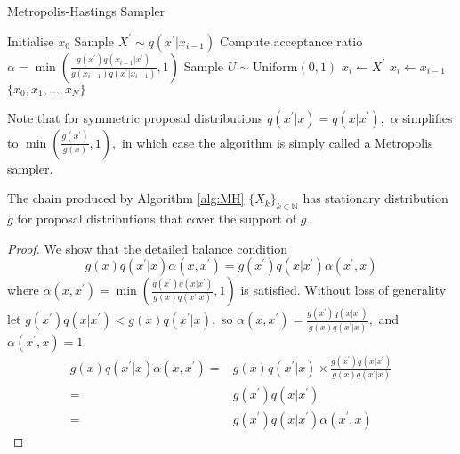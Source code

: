 \begin{algorithm}[htbp]
    \caption{Metropolis-Hastings Sampler}
    \label{alg:MH}
    \begin{algorithmic}
        \State Initialise $x_0$
        \State Sample $X^\prime \sim q(x^\prime|x_{i - 1})$
        \State Compute acceptance ratio
        $\alpha
            = \min\left(
            \frac{
            g(x^\prime) q(x_{i - 1}|x^\prime)
            }{
            g(x_{i - 1}) q(x^\prime|x_{i - 1})
            },
            1
            \right)$
        \State Sample $U \sim \text{Uniform}(0, 1)$
        \State $x_i \gets X^\prime$
        \Else
        \State $x_i \gets x_{i-1}$
        \EndIf
        \EndFor
        \State \Return $\{x_0, x_1, \dots, x_N\}$
    \end{algorithmic}
\end{algorithm}

Note that for symmetric proposal distributions $q(x^\prime|x) = q(x|x^\prime),$
$\alpha$ simplifies to $\min\left(\frac{g(x^\prime)}{g(x)}, 1\right),$ in
which case the algorithm is simply called a Metropolis sampler.

\begin{theorem}
    The chain produced by Algorithm \ref{alg:MH} $\{X_k\}_{k\in \mathbb{N}}$
    has stationary distribution $g$ for proposal distributions that cover the
    support of $g.$
\end{theorem}

\begin{proof}
    We show that the detailed balance condition
    $$
        g(x)q(x^\prime | x)\alpha(x, x^\prime)
        =g(x^\prime)q(x | x^\prime)\alpha(x^\prime, x)
    $$
    where $\alpha(x, x^\prime) = \min\left(
        \frac{
                g(x^\prime) q(x|x^\prime)
            }{
                g(x) q(x^\prime|x)
            },
        1
        \right)$
    is satisfied. Without loss of generality let
    $g(x^\prime) q(x|x^\prime) < g(x) q(x^\prime|x),$ so
    $\alpha(x, x^\prime) = \frac{
            g(x^\prime) q(x|x^\prime)
        }{
            g(x) q(x^\prime|x)
        },$ and $\alpha(x^\prime, x) = 1.$
    \begin{align*}
        g(x)q(x^\prime | x)\alpha(x, x^\prime)
        = & g(x)q(x^\prime | x) \times \frac{
            g(x^\prime) q(x|x^\prime)
        }{
            g(x) q(x^\prime|x)
        }                                                \\
        = & g(x^\prime) q(x|x^\prime)                    \\
        = & g(x^\prime) q(x|x^\prime)\alpha(x^\prime, x)
    \end{align*}
\end{proof}

